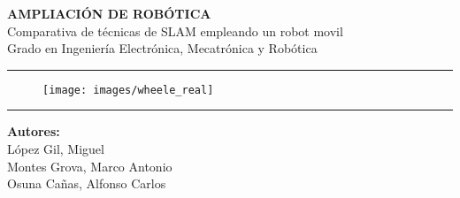 \documentclass[a4paper,twoside]{article}
\begin{document}

\begin{titlepage}
\centering
\Huge{\textbf{AMPLIACIÓN DE ROBÓTICA}} \\
\Huge{Comparativa de técnicas de SLAM empleando un robot movil}\\

\vspace{2cm}
\LARGE{Grado en Ingeniería Electrónica, Mecatrónica y Robótica}\\
\rule{\textwidth}{0.1mm}
\begin{figure}[h!]
	\centering
	\texttt{[image: images/wheele\_real]}
\end{figure}
\vspace{2cm}
\rule{\textwidth}{0.1mm}
\Large{\textbf{Autores:} \\
                         López Gil, Miguel \\
                         Montes Grova, Marco Antonio\\
                         Osuna Cañas, Alfonso Carlos}
\end{titlepage}
\newpage
\tableofcontents
\newpage
\end{document}
